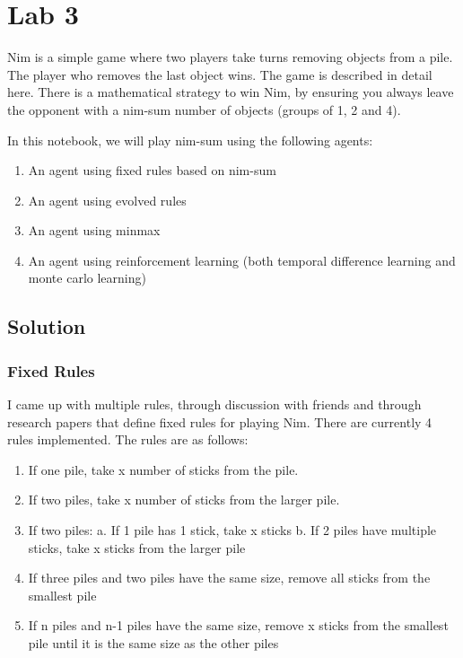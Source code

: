 
\section{Lab 3}

Nim is a simple game where two players take turns removing objects from a pile. The player who removes the last object wins. The game is described in detail here. There is a mathematical strategy to win Nim, by ensuring you always leave the opponent with a nim-sum number of objects (groups of 1, 2 and 4).

In this notebook, we will play nim-sum using the following agents:

\begin{enumerate}
    \item An agent using fixed rules based on nim-sum
    \item An agent using evolved rules
    \item An agent using minmax
    \item An agent using reinforcement learning (both temporal difference learning and monte carlo learning)
\end{enumerate}


\subsection{Solution}

\subsubsection{Fixed Rules}

I came up with multiple rules, through discussion with friends and through research papers that define fixed rules for playing Nim. There are currently 4 rules implemented. The rules are as follows:

\begin{enumerate}
    \item If one pile, take x number of sticks from the pile.
    \item If two piles, take x number of sticks from the larger pile.
    \item If two piles: a. If 1 pile has 1 stick, take x sticks b. If 2 piles have multiple sticks, take x sticks from the larger pile
    \item If three piles and two piles have the same size, remove all sticks from the smallest pile
    \item If n piles and n-1 piles have the same size, remove x sticks from the smallest pile until it is the same size as the other piles
\end{enumerate}

